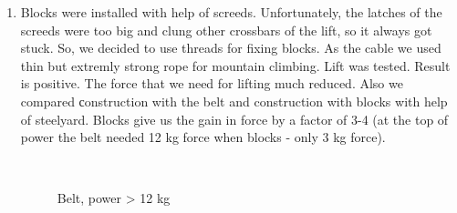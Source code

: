 \begin{enumerate}
\begin{enumerate}
		\item Blocks were installed with help of screeds. Unfortunately, the latches of the screeds were too big and clung other crossbars of the lift, so it always got stuck. So, we decided to use threads for fixing blocks. As the cable we used thin but extremly strong rope for mountain climbing. Lift was tested. Result is positive. The force that we need for lifting much reduced. Also we compared сonstruction with the belt and construction with blocks with help of steelyard. Blocks give us the gain in force by a factor of 3-4 (at the top of power the belt needed 12 kg force when blocks - only 3 kg force). 
		\begin{figure}[H]
			\begin{minipage}[h]{0.6\linewidth}
				\caption{Belt, power > 12 kg}  
			\end{minipage}
			\hfill
			\begin{minipage}[h]{0.37\linewidth}

\end{minipage}
\end{figure}
\end{enumerate}
\end{enumerate}
